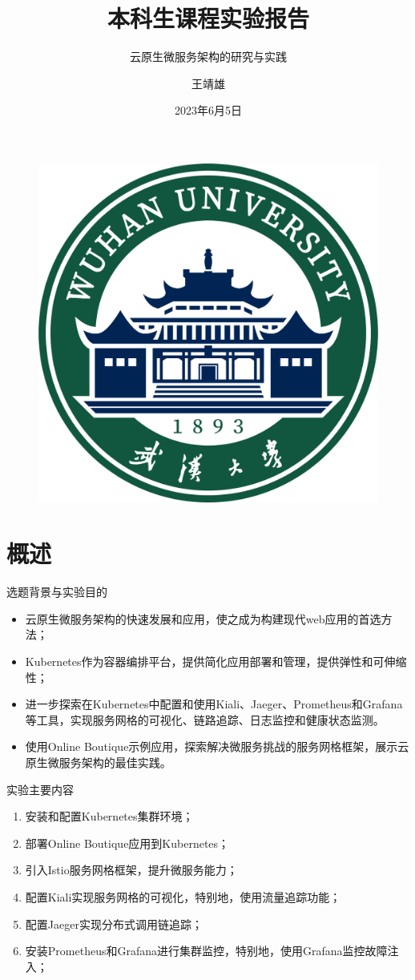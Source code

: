 \documentclass{beamer}
\author{王靖雄}
\title{本科生课程实验报告}
\subtitle{云原生微服务架构的研究与实践}
\institute{2020302111399}
\date{2023年6月5日}
\begin{document}
\kaishu
\begin{frame}
    \titlepage
    \begin{figure}[htpb]
        \begin{center}
            \includegraphics[width=0.2\linewidth]{pic/whulogo.png}
        \end{center}
    \end{figure}
\end{frame}

\begin{frame}
    \tableofcontents[sectionstyle=show,subsectionstyle=show/shaded/hide,subsubsectionstyle=show/shaded/hide]
\end{frame}

\section{概述}
\begin{frame}{选题背景与实验目的}
	\begin{itemize}
		\item 云原生微服务架构的快速发展和应用，使之成为构建现代web应用的首选方法；
		\item Kubernetes作为容器编排平台，提供简化应用部署和管理，提供弹性和可伸缩性；
		\item 进一步探索在Kubernetes中配置和使用Kiali、Jaeger、Prometheus和Grafana等工具，实现服务网格的可视化、链路追踪、日志监控和健康状态监测。
		\item 使用Online Boutique示例应用，探索解决微服务挑战的服务网格框架，展示云原生微服务架构的最佳实践。
	\end{itemize}
\end{frame}

\begin{frame}{实验主要内容}
\begin{enumerate}
	\item 安装和配置Kubernetes集群环境；
	\item 部署Online Boutique应用到Kubernetes；
	\item 引入Istio服务网格框架，提升微服务能力；
	\item 配置Kiali实现服务网格的可视化，特别地，使用流量追踪功能；
	\item 配置Jaeger实现分布式调用链追踪；
	\item 安装Prometheus和Grafana进行集群监控，特别地，使用Grafana监控故障注入；
\end{enumerate}
\end{frame}
\end{document}
